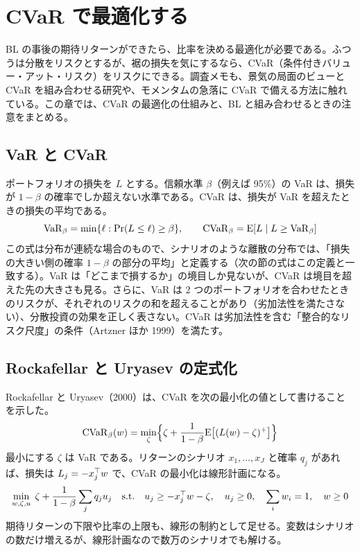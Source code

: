 \chapter{CVaR で最適化する}\label{ch:cvar}

BL の事後の期待リターンができたら、比率を決める最適化が必要である。ふつうは分散をリスクとするが、裾の損失を気にするなら、CVaR（条件付きバリュー・アット・リスク）をリスクにできる。調査メモも、景気の局面のビューと CVaR を組み合わせる研究や、モメンタムの急落に CVaR で備える方法に触れている。この章では、CVaR の最適化の仕組みと、BL と組み合わせるときの注意をまとめる。

\section{VaR と CVaR}

ポートフォリオの損失を $L$ とする。信頼水準 $\beta$（例えば 95\%）の VaR は、損失が $1-\beta$ の確率でしか超えない水準である。CVaR は、損失が VaR を超えたときの損失の平均である。
\begin{equation}
\mathrm{VaR}_\beta=\min\{\ell:\Pr(L\le\ell)\ge\beta\},\qquad
\mathrm{CVaR}_\beta=\mathrm{E}[L\mid L\ge\mathrm{VaR}_\beta]
\end{equation}
この式は分布が連続な場合のもので、シナリオのような離散の分布では、「損失の大きい側の確率 $1-\beta$ の部分の平均」と定義する（次の節の式はこの定義と一致する）。VaR は「どこまで損するか」の境目しか見ないが、CVaR は境目を超えた先の大きさも見る。さらに、VaR は 2 つのポートフォリオを合わせたときのリスクが、それぞれのリスクの和を超えることがあり（劣加法性を満たさない）、分散投資の効果を正しく表さない。CVaR は劣加法性を含む「整合的なリスク尺度」の条件（Artzner ほか 1999）を満たす。

\section{Rockafellar と Uryasev の定式化}

Rockafellar と Uryasev（2000）は、CVaR を次の最小化の値として書けることを示した。
\begin{equation}
\mathrm{CVaR}_\beta(w)=\min_\zeta\Bigl\{\zeta+\frac{1}{1-\beta}\mathrm{E}\bigl[(L(w)-\zeta)^+\bigr]\Bigr\}
\label{eq:ru}
\end{equation}
最小にする $\zeta$ は VaR である。リターンのシナリオ $x_1,\dots,x_J$ と確率 $q_j$ があれば、損失は $L_j=-x_j^{\top} w$ で、CVaR の最小化は線形計画になる。
\begin{equation}
\min_{w,\zeta,u}\;\zeta+\frac{1}{1-\beta}\sum_j q_ju_j
\quad\text{s.t.}\quad u_j\ge-x_j^{\top} w-\zeta,\quad u_j\ge0,\quad \sum_iw_i=1,\quad w\ge0
\label{eq:ru-lp}
\end{equation}
期待リターンの下限や比率の上限も、線形の制約として足せる。変数はシナリオの数だけ増えるが、線形計画なので数万のシナリオでも解ける。

